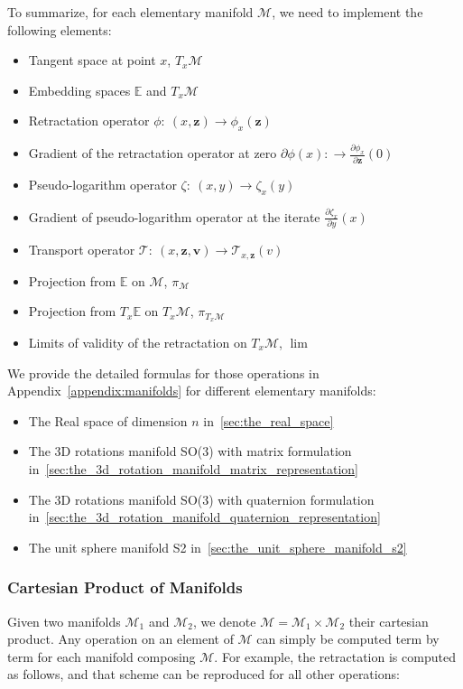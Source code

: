 To summarize, for each elementary manifold $\mathcal{M}$, we need to implement the following elements:
\begin{itemize}
  \item Tangent space at point $x$, $T_x\mathcal{M}$
  \item Embedding spaces $\mathbb{E}$ and $T_x\mathcal{M}$
  \item Retractation operator $\phi:\ (x,\mathbf{z}) \rightarrow \phi_x(\mathbf{z})$
  \item Gradient of the retractation operator at zero $\partial \phi(x):\rightarrow \frac{\partial \phi_x}{\partial \mathbf{z}}(0)$
  \item Pseudo-logarithm operator $\zeta:\ (x,y) \rightarrow \zeta_x(y)$
  \item Gradient of pseudo-logarithm operator at the iterate $\frac{\partial \zeta_x}{\partial y}(x)$
  \item Transport operator $\mathcal{T}:\ (x,\mathbf{z}, \mathbf{v})\rightarrow \mathcal{T}_{x,\mathbf{z}}(v)$
  \item Projection from $\mathbb{E}$ on $\mathcal{M}$, $\pi_\mathcal{M}$
  \item Projection from $T_x\mathbb{E}$ on $T_x\mathcal{M}$, $\pi_{T_x\mathcal{M}}$
  \item Limits of validity of the retractation on $T_x\mathcal{M}$, $\lim$
\end{itemize}

We provide the detailed formulas for those operations in Appendix~\ref{appendix:manifolds} for different elementary manifolds:
\begin{itemize}
  \item The Real space of dimension $n$ in~\ref{sec:the_real_space}
  \item The 3D rotations manifold SO(3) with matrix formulation in~\ref{sec:the_3d_rotation_manifold_matrix_representation}
  \item The 3D rotations manifold SO(3) with quaternion formulation in~\ref{sec:the_3d_rotation_manifold_quaternion_representation}
  \item The unit sphere manifold S2 in~\ref{sec:the_unit_sphere_manifold_s2}
\end{itemize}

\subsubsection{Cartesian Product of Manifolds}
\label{ssub:cartesian_product_of_manifolds}
Given two manifolds $\mathcal{M}_1$ and $\mathcal{M}_2$, we denote $\mathcal{M}=\mathcal{M}_1\times\mathcal{M}_2$ their cartesian product.
Any operation on an element of $\mathcal{M}$ can simply be computed term by term for each manifold composing $\mathcal{M}$.
For example, the retractation is computed as follows, and that scheme can be reproduced for all other operations:

